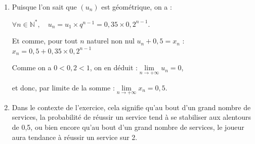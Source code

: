 \documentclass[10pt]{article}
\providecommand{\N}{\mathbb{N}}
\begin{document}
\begin{enumerate}
\begin{enumerate}
	\item Puisque l'on sait que $(u_n)$ est géométrique, on a :

$\forall n \in \N^*,\quad u_n = u_1 \times q^{n-1} = 0,35 \times 0,2^{n-1}$.

Et comme, pour tout $n$ naturel non nul $u_n + 0,5 = x_n$ :\quad $x_n = 0,5 + 0,35 \times 0,2^{n-1}$

Comme on a $0 < 0,2 < 1$, on en déduit :\quad$\lim\limits_{n \to +\infty} u_n = 0$,

	et donc, par limite de la somme :\quad $\lim\limits_{n \to +\infty} x_n = 0,5$.


	\item Dans le contexte de l'exercice, cela signifie qu'au bout d'un grand nombre de services, la probabilité de réussir un service tend à se stabiliser aux alentours de 0,5, ou bien encore qu'au bout d'un grand nombre de services, le joueur aura tendance à réussir un service sur 2.
\end{enumerate}
\end{enumerate}
\end{document}
